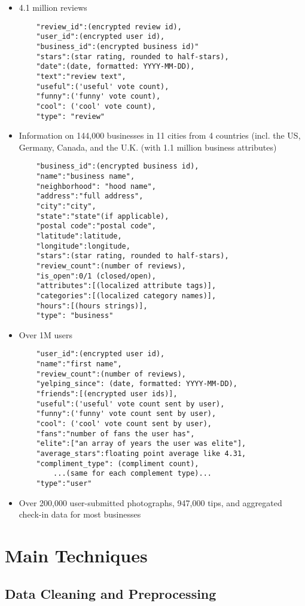 \begin{itemize}
	\item{4.1 million reviews}
	\begin{verbatim}
	"review_id":(encrypted review id),
	"user_id":(encrypted user id),
	"business_id":(encrypted business id)"
	"stars":(star rating, rounded to half-stars),
	"date":(date, formatted: YYYY-MM-DD),
	"text":"review text",
	"useful":('useful' vote count),
	"funny":('funny' vote count),
	"cool": ('cool' vote count),
	"type": "review"
	\end{verbatim}
	\item{Information on 144,000 businesses in 11 cities from 4 countries (incl. the US, Germany, Canada, and the U.K. (with 1.1 million business attributes)}
	\begin{verbatim}
	"business_id":(encrypted business id),
	"name":"business name",
	"neighborhood": "hood name",
	"address":"full address",
	"city":"city",
	"state":"state"(if applicable),
	"postal code":"postal code",
	"latitude":latitude,
	"longitude":longitude,
	"stars":(star rating, rounded to half-stars),
	"review_count":(number of reviews),
	"is_open":0/1 (closed/open),
	"attributes":[(localized attribute tags)],
	"categories":[(localized category names)],
	"hours":[(hours strings)],
	"type": "business"
	\end{verbatim}
	\item{Over 1M users}
	\begin{verbatim}
	"user_id":(encrypted user id),
	"name":"first name",
	"review_count":(number of reviews),
	"yelping_since": (date, formatted: YYYY-MM-DD),
	"friends":[(encrypted user ids)],
	"useful":('useful' vote count sent by user),
	"funny":('funny' vote count sent by user),
	"cool": ('cool' vote count sent by user),
	"fans":"number of fans the user has",
	"elite":["an array of years the user was elite"],
	"average_stars":floating point average like 4.31,
	"compliment_type": (compliment count),
		...(same for each complement type)...
	"type":"user"
	\end{verbatim}
	\item{Over 200,000 user-submitted photographs, 947,000 tips, and aggregated check-in data for most businesses}
\end{itemize}

\section{Main Techniques}

\subsection{Data Cleaning and Preprocessing}

